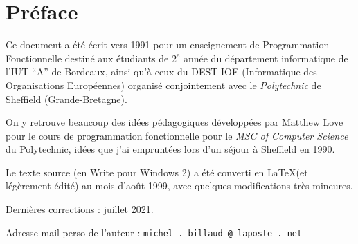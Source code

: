 \chapter*{Préface}


Ce document a été écrit vers 1991 pour un enseignement de Programmation
Fonctionnelle destiné aux étudiants de $2^e$ année du département informatique
de l'IUT ``A'' de Bordeaux, ainsi qu'à ceux du DEST IOE (Informatique des
Organisations Européennes) organisé conjointement avec le
\emph{Polytechnic} de Sheffield (Grande-Bretagne).

On y retrouve beaucoup des idées pédagogiques développées par Matthew
Love pour le cours de programmation fonctionnelle pour le \emph{MSC of
Computer Science} du Polytechnic, idées que j'ai empruntées lors d'un
séjour à Sheffield en 1990.

Le texte source (en Write pour Windows 2) a été converti en \LaTeX (et
légèrement édité) au mois d'août 1999, avec quelques modifications
très mineures.

Dernières corrections : juillet 2021.

Adresse mail perso de l'auteur : \texttt{michel . billaud @ laposte . net}





